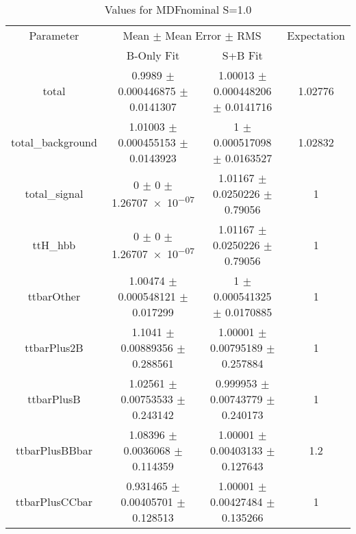 \begin{table}
\centering
\caption{Values for MDFnominal S=1.0}
\begin{tabular}{cccc}
\toprule
Parameter & \multicolumn{2}{c}{Mean $\pm$ Mean Error $\pm$ RMS} & Expectation\\
 & B-Only Fit & S+B Fit & \\
\midrule
total & \num{0.9989} $\pm$ \num{0.000446875} $\pm$ \num{0.0141307} & \num{1.00013} $\pm$ \num{0.000448206} $\pm$ \num{0.0141716} & \num{1.02776}\\
total\_background & \num{1.01003} $\pm$ \num{0.000455153} $\pm$ \num{0.0143923} & \num{1} $\pm$ \num{0.000517098} $\pm$ \num{0.0163527} & \num{1.02832}\\
total\_signal & \num{0} $\pm$ \num{0} $\pm$ \num{1.26707e-07} & \num{1.01167} $\pm$ \num{0.0250226} $\pm$ \num{0.79056} & \num{1}\\
ttH\_hbb & \num{0} $\pm$ \num{0} $\pm$ \num{1.26707e-07} & \num{1.01167} $\pm$ \num{0.0250226} $\pm$ \num{0.79056} & \num{1}\\
ttbarOther & \num{1.00474} $\pm$ \num{0.000548121} $\pm$ \num{0.017299} & \num{1} $\pm$ \num{0.000541325} $\pm$ \num{0.0170885} & \num{1}\\
ttbarPlus2B & \num{1.1041} $\pm$ \num{0.00889356} $\pm$ \num{0.288561} & \num{1.00001} $\pm$ \num{0.00795189} $\pm$ \num{0.257884} & \num{1}\\
ttbarPlusB & \num{1.02561} $\pm$ \num{0.00753533} $\pm$ \num{0.243142} & \num{0.999953} $\pm$ \num{0.00743779} $\pm$ \num{0.240173} & \num{1}\\
ttbarPlusBBbar & \num{1.08396} $\pm$ \num{0.0036068} $\pm$ \num{0.114359} & \num{1.00001} $\pm$ \num{0.00403133} $\pm$ \num{0.127643} & \num{1.2}\\
ttbarPlusCCbar & \num{0.931465} $\pm$ \num{0.00405701} $\pm$ \num{0.128513} & \num{1.00001} $\pm$ \num{0.00427484} $\pm$ \num{0.135266} & \num{1}\\
\bottomrule
\end{tabular}
\end{table}